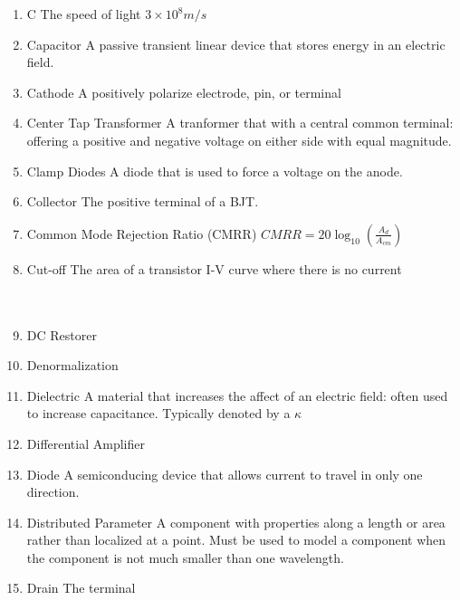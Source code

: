 \documentclass{IEEEtran}
\begin{document}
\begin{enumerate}
\\
\item C
  \subitem The speed of light $3\times10^8 m/s$
\item Capacitor
  \subitem A passive transient linear device that stores energy in an electric field.\\
\item Cathode
  \subitem A positively polarize electrode, pin, or terminal\\
\item Center Tap Transformer
  \subitem A tranformer that with a central common terminal: offering a positive and negative voltage on either side with equal magnitude.\\
\item Clamp Diodes
  \subitem A diode that is used to force a voltage on the anode.\\
\item Collector
  \subitem The positive terminal of a BJT.\\
\item Common Mode Rejection Ratio (CMRR)
  \subitem $CMRR = 20\log_{10} \left(\frac{A_d}{A_{cm}}\right)$ \\
\item Cut-off
  \subitem The area of a transistor I-V curve where there is no current \\ 
\\

\\
\item DC Restorer
  \subitem \\
\item Denormalization
  \subitem \\ 
\item Dielectric
  \subitem A material that increases the affect of an electric field: often used to increase capacitance. Typically denoted by a $\kappa$ \\
\item Differential Amplifier
  \subitem \\
\item Diode
  \subitem A semiconducing device that allows current to travel in only one direction.\\
\item Distributed Parameter
  \subitem A component with properties along a length or area rather than localized at a point. Must be used to model a component when the component is not much smaller than one wavelength. \\ 
\item Drain
  \subitem The terminal 


\end{enumerate}
\end{document}
